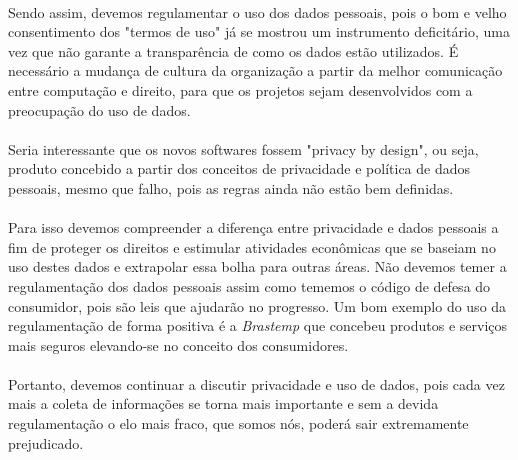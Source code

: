 \documentclass[12pt]{article}
\begin{document}
	\paragraph{}
		Sendo assim, devemos regulamentar o uso dos dados pessoais, pois o	
		bom e velho consentimento dos "termos de uso" já se mostrou um instrumento 
		deficitário, uma vez que não garante a transparência de como os dados estão
        utilizados. É necessário a mudança de cultura da organização a partir da melhor
		comunicação entre computação e direito, para que os projetos sejam 
		desenvolvidos com a preocupação do uso de dados.
	\paragraph{}
		Seria interessante que os novos softwares fossem "privacy by design", ou seja,
		produto concebido a partir dos conceitos de privacidade e
		política de dados pessoais, mesmo que falho, pois as regras ainda
		não estão bem definidas.
	\paragraph{}
		Para isso devemos compreender a diferença entre privacidade e dados pessoais 
		a fim de proteger os direitos e estimular atividades econômicas que se baseiam 
		no uso destes dados e extrapolar essa bolha para outras áreas. Não devemos
		temer a regulamentação dos dados pessoais assim como tememos o código de 
		defesa do consumidor, pois são leis que ajudarão no progresso. Um bom
		exemplo do uso da regulamentação de forma positiva é a \textit{Brastemp} que 
		concebeu produtos e serviços mais seguros elevando-se no conceito dos 
		consumidores.
	\paragraph{}
		Portanto, devemos continuar a discutir privacidade e uso de dados, pois
		cada vez mais a coleta de informações se torna mais importante e sem
		a devida regulamentação o elo mais fraco, que somos nós, poderá sair
		extremamente prejudicado.	
\end{document}
